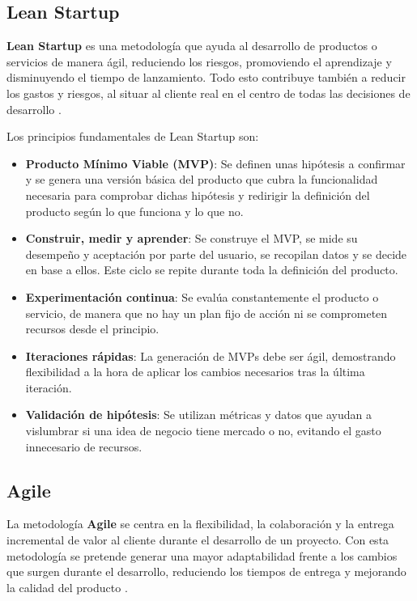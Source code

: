 \subsection{Lean Startup}

\textbf{Lean Startup} es una metodología que ayuda al desarrollo de productos o servicios de manera ágil, reduciendo los riesgos, promoviendo el aprendizaje y disminuyendo el tiempo de lanzamiento. Todo esto contribuye también a reducir los gastos y riesgos, al situar al cliente real en el centro de todas las decisiones de desarrollo \cite{leanstartup}.

Los principios fundamentales de Lean Startup son:

\begin{itemize}
  \item \textbf{Producto Mínimo Viable (MVP)}: Se definen unas hipótesis a confirmar y se genera una versión básica del producto que cubra la funcionalidad necesaria para comprobar dichas hipótesis y redirigir la definición del producto según lo que funciona y lo que no.

  \item \textbf{Construir, medir y aprender}: Se construye el MVP, se mide su desempeño y aceptación por parte del usuario, se recopilan datos y se decide en base a ellos. Este ciclo se repite durante toda la definición del producto.

  \item \textbf{Experimentación continua}: Se evalúa constantemente el producto o servicio, de manera que no hay un plan fijo de acción ni se comprometen recursos desde el principio.

  \item \textbf{Iteraciones rápidas}: La generación de MVPs debe ser ágil, demostrando flexibilidad a la hora de aplicar los cambios necesarios tras la última iteración.

  \item \textbf{Validación de hipótesis}: Se utilizan métricas y datos que ayudan a vislumbrar si una idea de negocio tiene mercado o no, evitando el gasto innecesario de recursos.
\end{itemize}

\subsection{Agile}

La metodología \textbf{Agile} se centra en la flexibilidad, la colaboración y la entrega incremental de valor al cliente durante el desarrollo de un proyecto. Con esta metodología se pretende generar una mayor adaptabilidad frente a los cambios que surgen durante el desarrollo, reduciendo los tiempos de entrega y mejorando la calidad del producto \cite{agile, what-is-agile, agile-essentials}.

